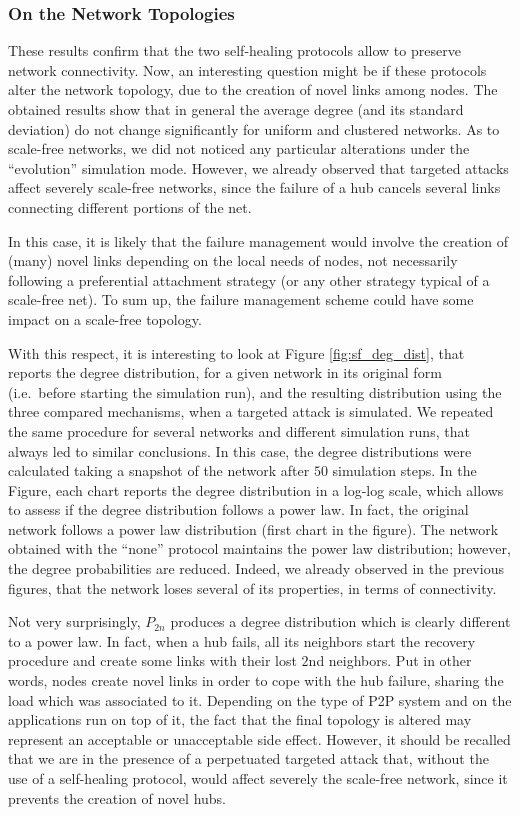 \documentclass[10pt, conference, compsocconf]{IEEEtran}
\begin{document}
\subsubsection{On the Network Topologies}
These results confirm that the two self-healing protocols allow to preserve network connectivity.
Now, an interesting question might be if these protocols alter the network topology, due to the creation of novel links among nodes. 
The obtained results show that in general the average degree (and its standard deviation) do not change significantly for uniform and clustered networks. As to scale-free networks, we did not noticed any particular alterations under the ``evolution'' simulation mode. 
However, we already observed that targeted attacks affect severely scale-free networks, since the failure of a hub cancels several links connecting different portions of the net. 

In this case, it is likely that the failure management would involve the creation of (many) novel links depending on the local needs of nodes, not necessarily following a preferential attachment strategy (or any other strategy typical of a scale-free net). To sum up, the failure management scheme could have some impact on a scale-free topology.

With this respect, it is interesting to look at Figure \ref{fig:sf_deg_dist}, that reports the degree distribution, for a given network in its original form (i.e.~before starting the simulation run), and the resulting distribution using the three compared mechanisms, when a targeted attack is simulated. We repeated the same procedure for several networks and different simulation runs, that always led to similar conclusions. In this case, the degree distributions were calculated taking a snapshot of the network after $50$ simulation steps.
In the Figure, each chart reports the degree distribution in a log-log scale, which allows to assess if the degree distribution follows a power law.
In fact, the original network follows a power law distribution (first chart in the figure). The network obtained with the ``none'' protocol maintains the power law distribution; however, the degree probabilities are reduced. Indeed, we already observed in the previous figures, that the network loses several of its properties, in terms of connectivity.

Not very surprisingly, $P_{2n}$ produces a degree distribution which is clearly different to a power law. In fact, when a hub fails, all its neighbors start the recovery procedure and create some links with their lost $2$nd neighbors. Put in other words, nodes create novel links in order to cope with the hub failure, sharing the load which was associated to it.
Depending on the type of P2P system and on the applications run on top of it, the fact that the final topology is altered may represent an acceptable or unacceptable side effect. However, it should be recalled that we are in the presence of a perpetuated targeted attack that, without the use of a self-healing protocol, would affect severely the scale-free network, since it prevents the creation of novel hubs.
\end{document}
